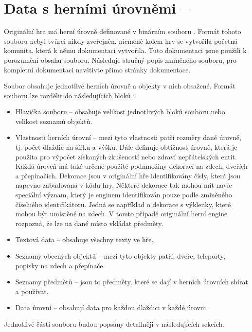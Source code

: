 \section{Data s herními úrovněmi -- }\label{dungeon-objects}

Originální hra má herní úrovně definované v binárním souboru . Formát tohoto souboru nebyl tvůrci nikdy zveřejněn,
nicméně kolem hry se vytvořila početná komunita, která k němu dokumentaci \cite{TechnicalDocumentationFontanel05} vytvořila.
Tuto dokumentaci jsme použili k porozumění obsahu souboru. Následuje stručný popis zmíněného souboru, pro 
kompletní dokumentaci navštivte přímo stránky dokumentace.

Soubor  obsahuje jednotlivé herních úrovně a objekty v nich obsažené.
 Formát souboru lze rozdělit do následujících bloků :
\begin{itemize}
\item Hlavička souboru -- obsahuje velikost jednotlivých bloků souboru nebo velikost seznamů objektů.
\item Vlastnosti herních úrovní -- mezi tyto vlastnosti patří rozměry dané úrovně, tj. počet dlaždic na šířku a výšku. Dále
	definuje obtížnost úrovně, která je použita pro výpočet získaných zkušeností nebo zdraví nepřátelských entit. Každá úroveň má
	také určené použité podmnožiny dekorací na zdech, dveřích a přepínačích. Dekorace jsou v originální hře identifikovány čísly, která
	jsou napevno zabudovaná v kódu hry. Některé dekorace tak mohou mít navíc speciální význam, který je enginem identifikován
	pouze podle zmíněného číselného identifikátoru. Jedná se například o dekorace s výklenky, které mohou být umístěné na zdech.
	V tomto případě originální herní engine rozpozná, že lze na dané místo vkládat předměty. 
\item Textová data -- obsahuje všechny texty ve hře.
\item Seznamy obecných objektů -- mezi tyto objekty patří, dveře, teleporty, popisky na zdech a přepínače.
\item Seznamy předmětů -- jsou to předměty, které se dají v herních úrovních sbírat a používat. 
\item Data úrovní -- obsahují data pro každou dlaždici v každé úrovni.
\end{itemize}
Jednotlivé části souboru budou popsány detailněji v následujících sekcích.



